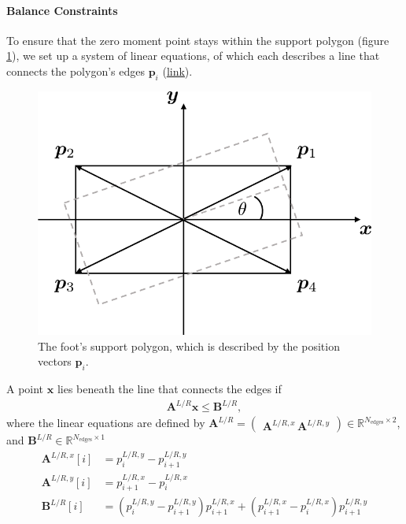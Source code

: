 \paragraph{Balance Constraints} 
To ensure that the zero moment point stays within the support polygon (figure \ref{fig::212_foot_hull}), we set up a system of linear equations, of which each describes a line that connects the polygon's edges $\bm{p}_i$ (\href{https://github.com/mhubii/nmpc_pattern_generator/blob/5a213044c927dc6aac9f7e32ce1e5fb472cd67bb/libs/pattern_generator/src/base_generator.cpp#L844}{\underline{link}}). 
\begin{figure}[h!]
	\centering
	\includegraphics[scale=.5]{chapters/02_background/img/foot_convex_hull.png}
	\caption{The foot's support polygon, which is described by the position vectors $\bm{p}_i$.}
	\label{fig::212_foot_hull}
\end{figure}
A point $\bm{x}$ lies beneath the line that connects the edges if
\begin{align}
	\bm{A}^{L/R}\bm{x} \leq \bm{B}^{L/R},
	\label{eq::212_lin}
\end{align}
where the linear equations are defined by  $\bm{A}^{L/R}=\begin{pmatrix}
\bm{A}^{L/R,x}\,\bm{A}^{L/R,y}\end{pmatrix}\in\mathbb{R}^{N_{\text{edges}}\times2}$, and $\bm{B}^{L/R}\in\mathbb{R}^{N_{\text{edges}}\times1}$
\begin{align}
	\bm{A}^{L/R,x}[i] &= p^{L/R,y}_i-p^{L/R,y}_{i+1} \\
	\bm{A}^{L/R,y}[i] &= p^{L/R,x}_{i+1}-p^{L/R,x}_i \\
	\bm{B}^{L/R}[i] &= (p^{L/R,y}_i-p^{L/R,y}_{i+1})p^{L/R,x}_{i+1} + (p^{L/R,x}_{i+1}-p^{L/R,x}_i)p^{L/R,y}_{i+1}
\end{align}
